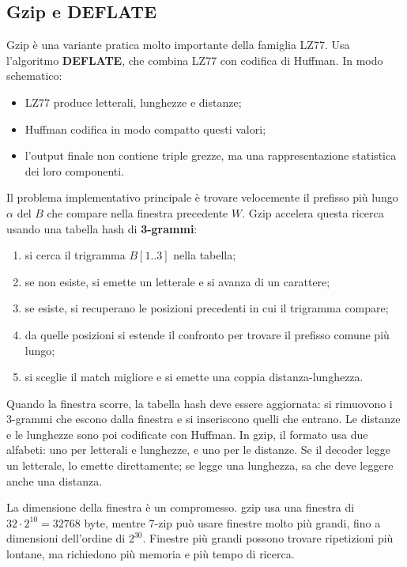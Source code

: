 \documentclass{article}
\theoremstyle{definition}
\numberwithin{equation}{section}
\begin{document}
\subsection{Gzip e DEFLATE}
Gzip è una variante pratica molto importante della famiglia LZ77. Usa l'algoritmo \textbf{DEFLATE}, che combina LZ77 con codifica di Huffman. In modo schematico:
\begin{itemize}
    \item LZ77 produce letterali, lunghezze e distanze;
    \item Huffman codifica in modo compatto questi valori;
    \item l'output finale non contiene triple grezze, ma una rappresentazione statistica dei loro componenti.
\end{itemize}

Il problema implementativo principale è trovare velocemente il prefisso più lungo $\alpha$ del  $B$ che compare nella finestra precedente $W$. Gzip accelera questa ricerca usando una tabella hash di \textbf{3-grammi}:
\begin{enumerate}
    \item si cerca il trigramma $B[1..3]$ nella tabella;
    \item se non esiste, si emette un letterale e si avanza di un carattere;
    \item se esiste, si recuperano le posizioni precedenti in cui il trigramma compare;
    \item da quelle posizioni si estende il confronto per trovare il prefisso comune più lungo;
    \item si sceglie il match migliore e si emette una coppia distanza-lunghezza.
\end{enumerate}

Quando la finestra scorre, la tabella hash deve essere aggiornata: si rimuovono i 3-grammi che escono dalla finestra e si inseriscono quelli che entrano. Le distanze e le lunghezze sono poi codificate con Huffman. In gzip, il formato usa due alfabeti: uno per letterali e lunghezze, e uno per le distanze. Se il decoder legge un letterale, lo emette direttamente; se legge una lunghezza, sa che deve leggere anche una distanza.

La dimensione della finestra è un compromesso. gzip usa una finestra di $32\cdot 2^{10}=32768$ byte, mentre 7-zip può usare finestre molto più grandi, fino a dimensioni dell'ordine di $2^{30}$. Finestre più grandi possono trovare ripetizioni più lontane, ma richiedono più memoria e più tempo di ricerca.
\end{document}
